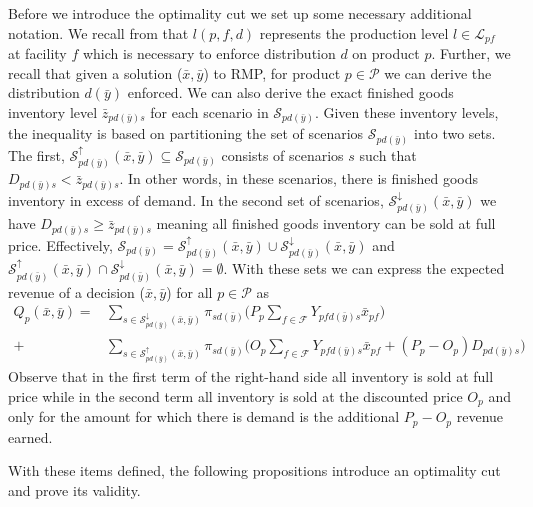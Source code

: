 \documentclass[12pt]{article}
\theoremstyle{thmstylethree}%
\begin{document}
Before we introduce the optimality cut we set up some necessary additional notation. We recall from  that $l(p,f,d)$ represents the production level $l \in \mathcal{L}_{pf}$ at facility $f$ which is necessary to enforce distribution $d$ on product $p$. Further, we recall that given a solution ($\bar{x},\bar{y}$) to RMP, for product $p \in \mathcal{P}$ we can derive the distribution $d(\bar{y})$ enforced. We can also derive the exact finished goods inventory level $\bar{z}_{pd(\bar{y})s}$ for each scenario in $\mathcal{S}_{pd(\bar{y})}$. Given these inventory levels, the inequality is based on partitioning the set of scenarios $\mathcal{S}_{pd(\bar{y})}$ into two sets. The first, $\mathcal{S}^{\uparrow}_{pd(\bar{y})}(\bar{x},\bar{y}) \subseteq \mathcal{S}_{pd(\bar{y})}$ consists of scenarios $s$ such that $D_{pd(\bar{y})s} < \bar{z}_{pd(\bar{y})s}$. In other words, in these scenarios, there is finished goods inventory in excess of demand. In the second set of scenarios, $\mathcal{S}^{\downarrow}_{pd(\bar{y})}(\bar{x},\bar{y})$ we have $D_{pd(\bar{y})s} \geq \bar{z}_{pd(\bar{y})s}$ meaning all finished goods inventory can be sold at full price. Effectively, $\mathcal{S}_{pd(\bar{y})} = \mathcal{S}^{\uparrow}_{pd(\bar{y})}(\bar{x},\bar{y}) \cup \mathcal{S}^{\downarrow}_{pd(\bar{y})}(\bar{x},\bar{y})$ and $\mathcal{S}^{\uparrow}_{pd(\bar{y})}(\bar{x},\bar{y}) \cap \mathcal{S}^{\downarrow}_{pd(\bar{y})}(\bar{x},\bar{y})=\emptyset$. With these sets we can express the expected revenue of a decision ($\bar{x},\bar{y}$) for all $p \in \mathcal{P}$ as
\begin{align}
\label{eq:eval}
Q_{p}(\bar{x},\bar{y}) =&  \sum_{s \in \mathcal{S}^{\downarrow}_{pd(\bar{y})}(\bar{x},\bar{y})  }  \pi_{sd(\bar{y})} \bigg(P_p \sum_{f \in \mathcal{F}}Y_{pfd(\bar{y})s}\bar{x}_{pf} \bigg)   \\ \nonumber  
+&\sum_{s \in \mathcal{S}^{\uparrow}_{pd(\bar{y})}(\bar{x},\bar{y})} \pi_{sd(\bar{y})}\bigg(O_p\sum_{f\in\mathcal{F}}Y_{pfd(\bar{y})s}\bar{x}_{pf}+(P_p-O_p)D_{pd(\bar{y})s}\bigg)
\end{align}
Observe that in the first term of the right-hand side all inventory is sold at full price while in the second term all inventory is sold at the discounted price $O_{p}$ and only for the amount for which there is demand is the additional $P_{p}-O_{p}$ revenue earned. 

With these items defined, the following propositions introduce an optimality cut and prove its validity.
\end{document}
